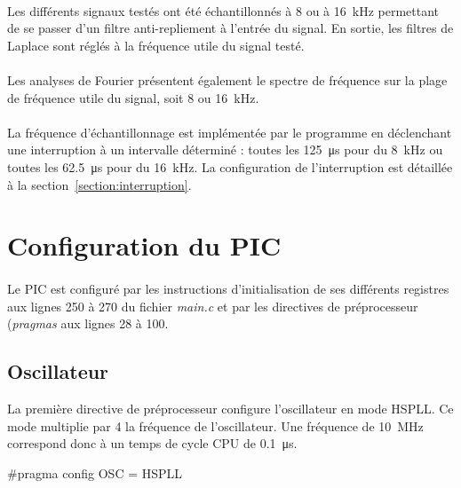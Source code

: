 \documentclass{article}
\begin{document}
    \paragraph{}
    Les différents signaux testés ont été échantillonnés à 8 ou à \SI{16}{\kilo\hertz} permettant de se passer d'un filtre anti-repliement à l'entrée du signal. En sortie, les filtres de Laplace sont réglés à la fréquence utile du signal testé.

    \paragraph{}
    Les analyses de Fourier présentent également le spectre de fréquence sur la plage de fréquence utile du signal, soit 8 ou \SI{16}{\kilo\hertz}.

    \paragraph{}
    La fréquence d'échantillonnage est implémentée par le programme en déclenchant une interruption à un intervalle déterminé : toutes les \SI{125}{\micro\second} pour du \SI{8}{\kilo\hertz} ou toutes les \SI{62.5}{\micro\second} pour du \SI{16}{\kilo\hertz}. La configuration de l'interruption est détaillée à la section~\ref{section:interruption}.



    \section{Configuration du PIC}
    \label{section:configuration}

    \paragraph{}
    Le PIC est configuré par les instructions d'initialisation de ses différents registres aux lignes 250 à 270 du fichier \emph{main.c} et par les directives de préprocesseur (\emph{pragmas} aux lignes 28 à 100.

    \subsection{Oscillateur}
    La première directive de préprocesseur configure l'oscillateur en mode HSPLL. Ce mode multiplie par 4 la fréquence de l'oscillateur. Une fréquence de \SI{10}{\mega\hertz} correspond donc à un temps de cycle CPU de \SI{0.1}{\micro\second}.
    \begin{verbatimtab}
     [29]    #pragma config OSC = HSPLL
    \end{verbatimtab}
\end{document}
